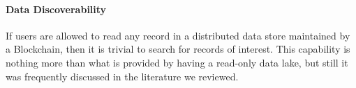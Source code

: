 
\paragraph{Data Discoverability}
If users are allowed to read any record in a distributed data store maintained 
by a Blockchain, then it is trivial to search for records of interest.
This capability is nothing more than what is provided by having a read-only data lake, but still it was frequently discussed in the literature we reviewed.